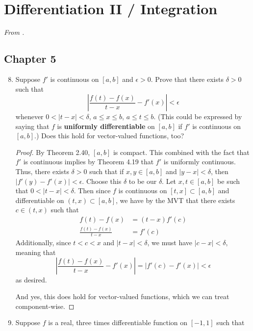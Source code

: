 \documentclass[../psets.tex]{subfiles}
\begin{document}
\section{Differentiation II / Integration}
\emph{From \textcite{bib:Rudin}.}
\subsection*{Chapter 5}
\begin{enumerate}[label={\textbf{\arabic*.}}]
    \setcounter{enumi}{7}
    \item Suppose $f'$ is continuous on $[a,b]$ and $\epsilon>0$. Prove that there exists $\delta>0$ such that
    \begin{equation*}
        \left| \frac{f(t)-f(x)}{t-x}-f'(x) \right| < \epsilon
    \end{equation*}
    whenever $0<|t-x|<\delta$, $a\leq x\leq b$, $a\leq t\leq b$. (This could be expressed by saying that $f$ is \textbf{uniformly differentiable} on $[a,b]$ if $f'$ is continuous on $[a,b]$.) Does this hold for vector-valued functions, too?
    \begin{proof}
        By Theorem 2.40, $[a,b]$ is compact. This combined with the fact that $f'$ is continuous implies by Theorem 4.19 that $f'$ is uniformly continuous. Thus, there exists $\delta>0$ such that if $x,y\in[a,b]$ and $|y-x|<\delta$, then $|f'(y)-f'(x)|<\epsilon$. Choose this $\delta$ to be our $\delta$. Let $x,t\in[a,b]$ be such that $0<|t-x|<\delta$. Then since $f$ is continuous on $[t,x]\subset[a,b]$ and differentiable on $(t,x)\subset[a,b]$, we have by the MVT that there exists $c\in(t,x)$ such that
        \begin{align*}
            f(t)-f(x) &= (t-x)f'(c)\\
            \frac{f(t)-f(x)}{t-x} &= f'(c)
        \end{align*}
        Additionally, since $t<c<x$ and $|t-x|<\delta$, we must have $|c-x|<\delta$, meaning that
        \begin{equation*}
            \left| \frac{f(t)-f(x)}{t-x}-f'(x) \right|
            = |f'(c)-f'(x)|
            < \epsilon
        \end{equation*}
        as desired.\par
        And yes, this does hold for vector-valued functions, which we can treat component-wise.
    \end{proof}
    \setcounter{enumi}{16}
    \item Suppose $f$ is a real, three times differentiable function on $[-1,1]$ such that

\end{enumerate}
\end{document}
